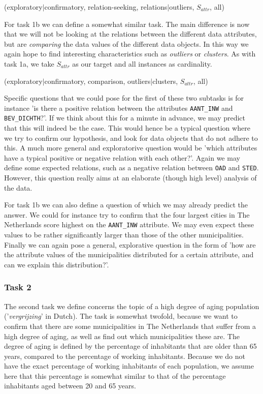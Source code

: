 (exploratory$|$confirmatory, relation-seeking, relations$|$outliers, $S_{attr}$, all)

For task 1b we can define a somewhat similar task. The main difference is now that we will not be looking at the relations between the different data attributes, but are \textit{comparing} the data values of the different data objects. In this way we again hope to find interesting characteristics such as \textit{outliers} or \textit{clusters}. As with task 1a, we take $S_{attr}$ as our target and all instances as cardinality.

(exploratory$|$confirmatory, comparison, outliers$|$clusters, $S_{attr}$, all)

Specific questions that we could pose for the first of these two subtasks is for instance 'is there a positive relation between the attributes \texttt{AANT\_INW} and \texttt{BEV\_DICHTH}?'. If we think about this for a minute in advance, we may predict that this will indeed be the case. This would hence be a typical question where we try to confirm our hypothesis, and look for data objects that do not adhere to this. A much more general and exploratorive question would be 'which attributes have a typical positive or negative relation with each other?'. Again we may define some expected relations, such as a negative relation between \texttt{OAD} and \texttt{STED}. However, this question really aims at an elaborate (though high level) analysis of the data.

For task 1b we can also define a question of which we may already predict the answer. We could for instance try to confirm that the four largest cities in The Netherlands score highest on the \texttt{AANT\_INW} attribute. We may even expect these values to be rather significantly larger than those of the other municipalities. Finally we can again pose a general, explorative question in the form of 'how are the attribute values of the municipalities distributed for a certain attribute, and can we explain this distribution?'.


\subsubsection{Task 2}\label{sec:task2}
The second task we define concerns the topic of a high degree of aging population ('\textit{vergrijzing}' in Dutch). The task is somewhat twofold, because we want to confirm that there are some municipalities in The Netherlands that suffer from a high degree of aging, as well as find out which municipalities these are. The degree of aging is defined by the percentage of inhabitants that are older than 65 years, compared to the percentage of working inhabitants. Because we do not have the exact percentage of working inhabitants of each population, we assume here that this percentage is somewhat similar to that of the percentage inhabitants aged between 20 and 65 years.


